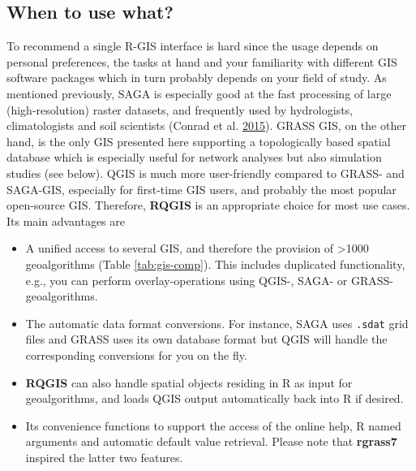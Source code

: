 \documentclass[]{krantz}
\providecommand{\tightlist}{%
  \setlength{\itemsep}{0pt}\setlength{\parskip}{0pt}}
\begin{document}
\hypertarget{when-to-use-what}{%
\subsection{When to use what?}\label{when-to-use-what}}

To recommend a single R-GIS interface is hard since the usage depends on personal preferences, the tasks at hand and your familiarity with different GIS software packages which in turn probably depends on your field of study.
As mentioned previously, SAGA is especially good at the fast processing of large (high-resolution) raster datasets, and frequently used by hydrologists, climatologists and soil scientists (Conrad et al. \protect\hyperlink{ref-conrad_system_2015}{2015}).
GRASS GIS, on the other hand, is the only GIS presented here supporting a topologically based spatial database which is especially useful for network analyses but also simulation studies (see below).
QGIS is much more user-friendly compared to GRASS- and SAGA-GIS, especially for first-time GIS users, and probably the most popular open-source GIS.
Therefore, \textbf{RQGIS} is an appropriate choice for most use cases.
Its main advantages are

\begin{itemize}
\tightlist
\item
  A unified access to several GIS, and therefore the provision of \textgreater{}1000 geoalgorithms (Table \ref{tab:gis-comp}).
  This includes duplicated functionality, e.g., you can perform overlay-operations using QGIS-, SAGA- or GRASS-geoalgorithms.
\item
  The automatic data format conversions.
  For instance, SAGA uses \texttt{.sdat} grid files and GRASS uses its own database format but QGIS will handle the corresponding conversions for you on the fly.
\item
  \textbf{RQGIS} can also handle spatial objects residing in R as input for geoalgorithms, and loads QGIS output automatically back into R if desired.
\item
  Its convenience functions to support the access of the online help, R named arguments and automatic default value retrieval.
  Please note that \textbf{rgrass7} inspired the latter two features.
\end{itemize}
\end{document}
